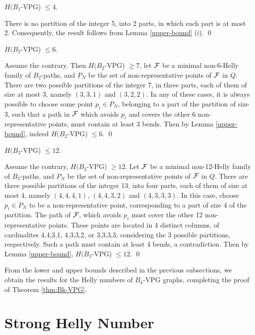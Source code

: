 \begin{lema}\label{claim:upper-B1-VPG}
$H(B_1$-VPG) $\leq  4$.
\end{lema}

\proof There is no partition of the integer 5, into 2 parts, in which each part is at most 2. Consequently, the result follows from Lemma \ref{upper-bound} (i). \qed

\begin{lema}\label{claim:upper-B2-VPG}
$H(B_2$-VPG)  $\leq  6$.
\end{lema}

\proof Assume the contrary. Then $H(B_2$-VPG) $\geq  7$, let $\cal F$ be a minimal non-6-Helly family of $B_2$-paths, and  $P_N$ be the set of non-representative points of $\cal F$ in $Q$. There are two possible partitions of the integer 7, in three parts, each of them of size at most 3, namely $(3,3,1)$ and $(3,2,2)$. In any of these cases,  it is always possible to choose some point  $p_i \in P_N$, belonging  to a part of the partition of size 3, such that a path in $\cal F$  which  avoids $p_i$ and covers the other 6 non-representative points, must contain at least 3 bends.  Then by Lemma \ref{upper-bound}, indeed $H(B_2$-VPG)  $\leq  6$. \qed


\begin{lema}\label{claim:upper-B3-VPG}
$H(B_3$-VPG) $\leq  12$.
\end{lema}

\proof Assume the contrary, $H(B_3$-VPG) $\geq  12$. Let $\cal F$ be a minimal non-12-Helly family of $B_3$-paths, and  $P_N$ be the set of non-representative points of $\cal F$ in $Q$. There are three possible partitions of the integer 13, into four parts, each of them of size at most 4, namely $(4,4,4,1)$, $(4,4,3,2)$ and $(4,3,3,3)$. In this case, choose $p_i \in P_N$ to be a non-representative point, corresponding to a part of size $4$ of the partition.  The path of ${\cal F}$, which avoids $p_i$ must cover the other 12 non-representative points. These points are located in 4 distinct columns, of cardinalites 4,4,3,1, 4,3,3,2, or 3,3,3,3, considering the 3 possible partitions, respectively. Such a path must contain at least 4 bends, a contradiction. Then by Lemma \ref{upper-bound}, $H(B_3$-VPG) $\leq  12$.    \qed  

From the lower and upper bounds described in the previous subsections, we obtain the results for the Helly numbers of $B_k$-VPG graphs, completing the proof of Theorem \ref{thm:Bk-VPG}.

\section{Strong Helly Number}\label{sec:helly-forte}

